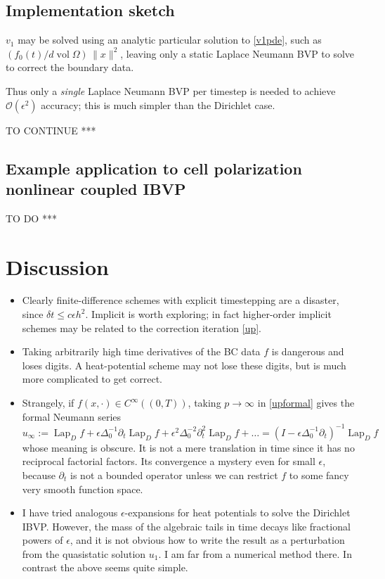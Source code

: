 \documentclass[10pt]{article}
\newcommand{\bi}{\begin{itemize}}
\newcommand{\ei}{\end{itemize}}
\newcommand{\be}{\begin{equation}}
\newcommand{\ee}{\end{equation}}
\newcommand{\bigO}{{\mathcal O}}
\DeclareMathOperator{\vol}{vol}
\newcommand{\eps}{\epsilon}
\newcommand{\dt}{\partial_t}
\DeclareMathOperator{\Lap}{Lap}
\begin{document}
\subsection{Implementation sketch}

$v_1$ may be solved using an analytic particular solution to \eqref{v1pde},
such as $(f_0(t)/d \vol\Omega)\,\|x\|^2$, leaving
only a static Laplace Neumann BVP to solve to correct the boundary data.

Thus only a {\em single} Laplace Neumann BVP per timestep is needed
to achieve $\bigO(\eps^2)$ accuracy; this is much simpler than
the Dirichlet case.

TO CONTINUE ***


\subsection{Example application to cell polarization nonlinear coupled IBVP}


TO DO ***






\section{Discussion}

\bi
\item
  Clearly finite-difference schemes with explicit timestepping are
  a disaster, since $\delta t \le c \eps h^2$.
  Implicit is worth exploring; in fact higher-order
  implicit schemes may be related to the correction iteration \eqref{up}.
\item
  Taking arbitrarily high time derivatives of the BC data $f$ is dangerous
  and loses digits. A heat-potential scheme may not lose these digits,
  but is much more complicated to get correct.
\item
Strangely, if $f(x,\cdot) \in C^\infty((0,T))$,
taking $p\to\infty$ in \eqref{upformal} gives the formal Neumann series
\be
u_\infty := \Lap_D f + \eps \Delta_0^{-1} \dt \Lap_D f + \eps^2 \Delta_0^{-2} \dt^2 \Lap_D f + \dots
= (I - \eps \Delta_0^{-1} \dt)^{-1} \Lap_D f
\ee
whose meaning is obscure.
It is not a mere translation in time since it has no
reciprocal factorial factors. Its convergence a mystery
even for small $\eps$, because $\dt$ is not a bounded operator
unless we can restrict $f$ to some fancy very smooth function space.
\item
  I have tried analogous $\eps$-expansions for heat potentials
  to solve the Dirichlet IBVP.
  However, the mass of the algebraic tails in time decays like
  fractional powers of $\eps$, and it is not obvious how to
  write the result as a perturbation from the quasistatic solution $u_1$.
  I am far from a numerical method there. In contrast the above seems
  quite simple.
  \ei




\end{document}
